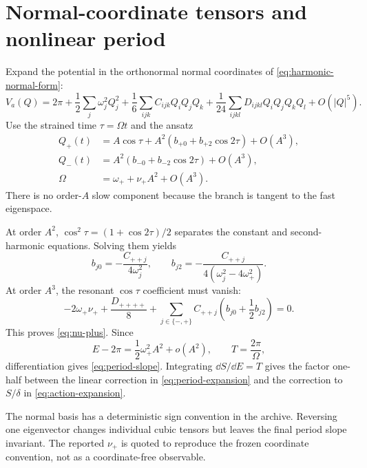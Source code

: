 \section{Normal-coordinate tensors and nonlinear period}
\label{app:nonlinear-period}

Expand the potential in the orthonormal normal coordinates of
\cref{eq:harmonic-normal-form}:
\begin{equation}
 V_a(Q)=2\pi+\frac{1}{2}\sum_j\omega_j^2Q_j^2
 +\frac{1}{6}\sum_{ijk}C_{ijk}Q_iQ_jQ_k
 +\frac{1}{24}\sum_{ijkl}D_{ijkl}Q_iQ_jQ_kQ_l
 +O(|Q|^5).
 \label{eq:potential-taylor}
\end{equation}
Use the strained time \(\tau=\Omega t\) and the ansatz
\begin{align}
 Q_+(t)&=A\cos\tau
 +A^2(b_{+0}+b_{+2}\cos2\tau)+O(A^3),
 \label{eq:pl-fast}\\
 Q_-(t)&=A^2(b_{-0}+b_{-2}\cos2\tau)+O(A^3),
 \label{eq:pl-slow}\\
 \Omega&=\omega_++\nu_+A^2+O(A^3).
 \label{eq:pl-frequency}
\end{align}
There is no order-\(A\) slow component because the branch is tangent to the
fast eigenspace.

At order \(A^2\), \(\cos^2\tau=(1+\cos2\tau)/2\) separates the constant and
second-harmonic equations.  Solving them yields
\begin{equation}
 b_{j0}=-\frac{C_{++j}}{4\omega_j^2},
 \qquad
 b_{j2}=-\frac{C_{++j}}{4(\omega_j^2-4\omega_+^2)}.
 \label{eq:pl-b-proof}
\end{equation}
At order \(A^3\), the resonant \(\cos\tau\) coefficient must vanish:
\begin{equation}
 -2\omega_+\nu_+
 +\frac{D_{++++}}8
 +\sum_{j\in\{-,+\}}C_{++j}
 \left(b_{j0}+\frac12b_{j2}\right)=0.
 \label{eq:resonance-solvability}
\end{equation}
This proves \cref{eq:nu-plus}.  Since
\begin{equation}
 E-2\pi=\frac12\omega_+^2A^2+o(A^2),
 \qquad T=\frac{2\pi}{\Omega},
 \label{eq:energy-amplitude}
\end{equation}
differentiation gives \cref{eq:period-slope}.  Integrating
\(\dd S/\dd E=T\) gives the factor one-half between the linear correction in
\cref{eq:period-expansion} and the correction to \(S/\delta\) in
\cref{eq:action-expansion}.

The normal basis has a deterministic sign convention in the archive.
Reversing one eigenvector changes individual cubic tensors but leaves the
final period slope invariant.  The reported \(\nu_+\) is quoted to reproduce
the frozen coordinate convention, not as a coordinate-free observable.
